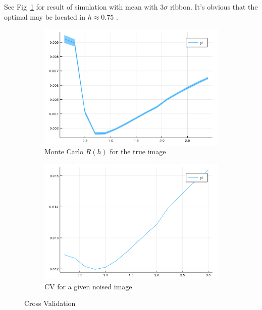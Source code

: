 \documentclass{beamer}
\begin{document}
\begin{frame}
  See Fig~\ref{fig:crossvalidation_mc} for result of simulation with mean with $3\sigma$ ribbon. 
  It's obvious that the optimal may be located in $h \approx 0.75$ .
  
  \begin{figure}[htb]
    \centering
    \begin{subfigure}[b]{0.49\linewidth}
      \includegraphics[width=\linewidth]{images/crossvalidation1.png}
      \caption{Monte Carlo $R(h)$ for the true image}
      \label{fig:crossvalidation_mc}
    \end{subfigure}
    \begin{subfigure}[b]{0.49\linewidth}
      \includegraphics[width=\linewidth]{images/crossvalidation2.png}
      \caption{CV for a given noised image}
      \label{fig:crossvalidation_cv}
    \end{subfigure}
    \caption{Cross Validation}
    \label{fig:crossvalidation}
  \end{figure}

\end{frame}
\end{document}

